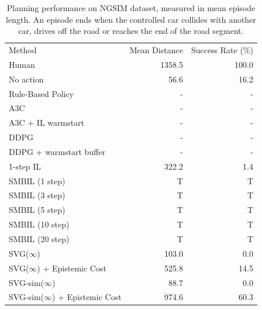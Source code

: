 \documentclass{article} %
\begin{document}
  \begin{table}[t]
    \centering
  \begin{tabular}{|lrr|}
    \hline
    Method & Mean Distance & Success Rate (\%)  \\
    \hhline{|===|}
    Human & 1358.5 & 100.0 \\
    \hline
    No action & 56.6 & 16.2 \\
    Rule-Based Policy & - & - \\
    \hline
    A3C & - & - \\
    A3C + IL warmstart & - & - \\
    DDPG & - & - \\
    DDPG + warmstart buffer & - & - \\
    \hline
    1-step IL & 322.2 & 1.4 \\
    SMBIL (1 step) & T & T \\
    SMBIL (3 step) & T & T \\
    SMBIL (5 step) & T & T \\
    SMBIL (10 step) & T & T \\
    SMBIL (20 step) & T & T \\
    \hline
    SVG($\infty$) & 103.0 & 0.0 \\
    SVG($\infty$) + Epistemic Cost & 525.8 & 14.5 \\    
    SVG-sim($\infty$) & 88.7 & 0.0 \\
    SVG-sim($\infty$) + Epistemic Cost & 974.6 & 60.3 \\
    \hline
  \end{tabular}
  \caption{Planning performance on NGSIM dataset, measured in mean episode length. An episode ends when the controlled car collides with another car, drives off the road or reaches the end of the road segment.}
  \label{main-table}
  \end{table}

    

    
\end{document}

